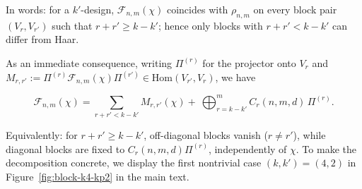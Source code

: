 \documentclass[aps,twocolumn,pra,superscriptaddress,nofootinbib]{revtex4-2}
\newcommand{\suma}[1]{\underset{#1}{\sum}}
\begin{document}
In words: for a \(k'\)-design, \(\mathcal F_{n,m}(\chi)\) coincides with \(\rho_{n,m}\) on every block pair \((V_r,V_{r'})\) such that \(r+r'\ge k-k'\); hence only blocks with \(r+r'<k-k'\) can differ from Haar.


As an immediate consequence, writing $\Pi^{(r)}$ for the projector onto $V_r$ and
$M_{r,r'}:=\Pi^{(r)}\mathcal F_{n,m}(\chi)\Pi^{(r')}\in\mathrm{Hom}(V_{r'},V_r)$, we have

\begin{equation}\label{Eq:FrameOpDecomp2}
\mathcal{F}_{n,m}(\chi)
=\suma{r+r'< k-k'}M_{r,r'}(\chi)
+ \ \bigoplus_{r=k-k'}^{m} C_r(n,m,d)\,\Pi^{(r)}.
\end{equation}

Equivalently: for $r+r'\ge k-k'$, off-diagonal blocks vanish ($r\neq r'$), while diagonal blocks are fixed to
$C_r(n,m,d)\Pi^{(r)}$, independently of $\chi$. To make the decomposition concrete, we display the first nontrivial case $(k,k')=(4,2)$ in Figure~\ref{fig:block-k4-kp2} in the main text. 


 
\end{document}
